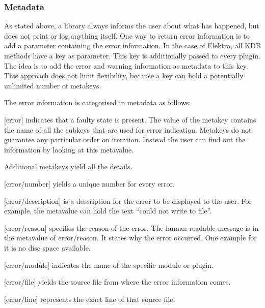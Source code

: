 \subsubsection*{Metadata}

As stated above, a library always informs the user about what has happened, but does not print or log anything itself. One way to return error information is to add a parameter containing the error information. In the case of Elektra, all {\ttfamily K\+DB} methods have a key as parameter. This key is additionally passed to every plugin. The idea is to add the error and warning information as metadata to this key. This approach does not limit flexibility, because a key can hold a potentially unlimited number of metakeys.

The error information is categorised in metadata as follows\+:


\begin{DoxyItemize}
\item \mbox{[}error\mbox{]} indicates that a faulty state is present. The value of the metakey contains the name of all the subkeys that are used for error indication. Metakeys do not guarantee any particular order on iteration. Instead the user can find out the information by looking at this metavalue.
\end{DoxyItemize}

Additional metakeys yield all the details.


\begin{DoxyItemize}
\item \mbox{[}error/number\mbox{]} yields a unique number for every error.
\item \mbox{[}error/description\mbox{]} is a description for the error to be displayed to the user. For example, the metavalue can hold the text “could not write to file”.
\item \mbox{[}error/reason\mbox{]} specifies the reason of the error. The human readable message is in the metavalue of {\ttfamily error/reason}. It states why the error occurred. One example for it is \textquotesingle{}\textquotesingle{}no disc space available\textquotesingle{}\textquotesingle{}.
\item \mbox{[}error/module\mbox{]} indicates the name of the specific module or plugin.
\item \mbox{[}error/file\mbox{]} yields the source file from where the error information comes.
\item \mbox{[}error/line\mbox{]} represents the exact line of that source file.
\end{DoxyItemize}

